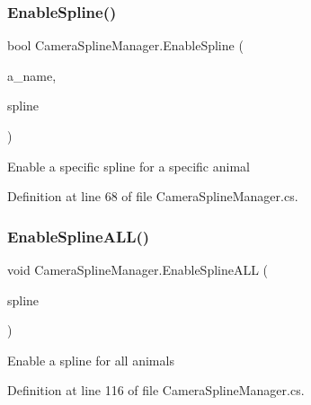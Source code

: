 \subsubsection{\texorpdfstring{Enable\+Spline()}{EnableSpline()}}
{\footnotesize\ttfamily bool Camera\+Spline\+Manager.\+Enable\+Spline (\begin{DoxyParamCaption}\item[{\mbox{\hyperlink{_animal_8cs_a2fa5713399b84d1b88dae9196837af50}{A\+N\+I\+M\+A\+L\+\_\+\+N\+A\+ME}}}]{a\+\_\+name,  }\item[{\mbox{\hyperlink{class_camera_mover}{Camera\+Mover}}}]{spline }\end{DoxyParamCaption})}



Enable a specific spline for a specific animal 



Definition at line 68 of file Camera\+Spline\+Manager.\+cs.

\mbox{\label{class_camera_spline_manager_a7f03d96e1777539de176b3ddb37fe8bf}} 
\subsubsection{\texorpdfstring{Enable\+Spline\+A\+L\+L()}{EnableSplineALL()}}
{\footnotesize\ttfamily void Camera\+Spline\+Manager.\+Enable\+Spline\+A\+LL (\begin{DoxyParamCaption}\item[{\mbox{\hyperlink{class_camera_mover}{Camera\+Mover}}}]{spline }\end{DoxyParamCaption})}



Enable a spline for all animals 



Definition at line 116 of file Camera\+Spline\+Manager.\+cs.

\mbox{\label{class_camera_spline_manager_ac0b989d5f875491e10640be8e796bf28}} 
